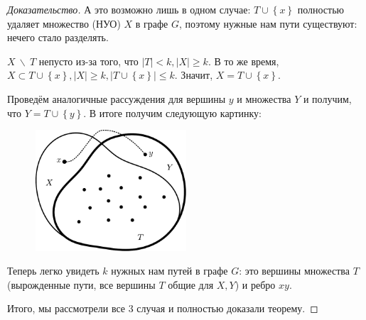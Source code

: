 \begin{proof}[Доказательство]
    А это возможно лишь в одном случае: $T \cup \left\{ x \right \} $ полностью удаляет множество (НУО) $X$ в графе $G$, поэтому нужные нам пути существуют: нечего стало разделять.

    $X \ \backslash \ T$ непусто из-за того, что $|T| < k, |X| \geq k$. В то же время, $X \subset T \cup \left\{ x \right \}, |X| \geq k, |T \cup \left\{ x \right \}| \leq k$. Значит, $X = T \cup \left\{ x \right \}$.

    \pagebreak
    Проведём аналогичные рассуждения для вершины $y$ и множества $Y$ и получим, что $Y = T \cup \left\{ y \right \} $. В итоге получим следующую картинку:

    \begin{figure}[H]
        \centering
        \includegraphics[width=0.5\textwidth]{images/menger_final}
    \end{figure}

    Теперь легко увидеть $k$ нужных нам путей в графе $G$: это вершины множества $T$ (вырожденные пути, все вершины $T$ общие для $X, Y$) и ребро $xy$.

    Итого, мы рассмотрели все 3 случая и полностью доказали теорему.
\end{proof}
